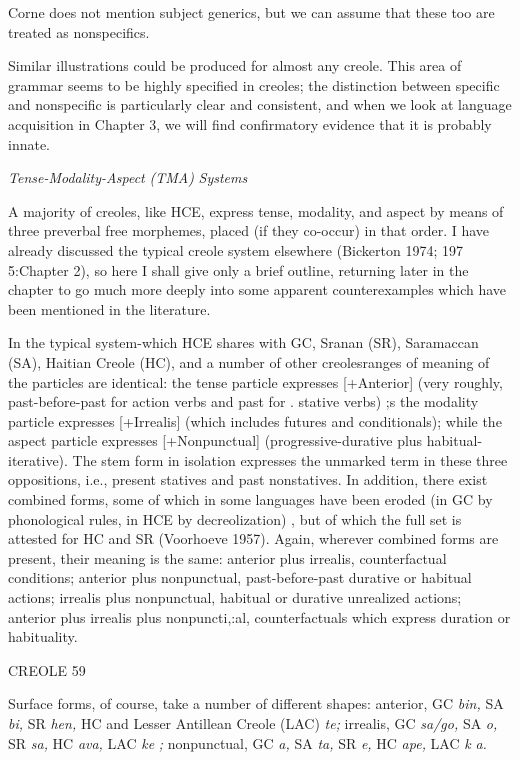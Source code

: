 Corne does not mention subject generics, but we can assume that these too are treated as nonspecifics.

Similar illustrations could be produced for almost any creole. This area of grammar seems to be highly specified in creoles; the dis\-tinction between specific and nonspecific is particularly clear and consistent, and when we look at language acquisition in Chapter 3, we will find confirmatory evidence that it is probably innate.

\textit{Tense-Modality-Aspect} \textit{(TM}\textit{A}\textit{)} \textit{S}\textit{ystems}

A majority of creoles, like HCE, express tense, modality, and aspect by means of three preverbal free morphemes, placed (if they co-occur) in that order. I have already discussed the typical creole system elsewhere (Bickerton 1974; 197 5:Chapter 2), so here I shall give only a brief outline, returning later in the chapter to go much more deeply into some apparent counterexamples which have been men\-tioned in the literature.

In the typical system-which HCE shares with GC, Sranan (SR), Saramaccan (SA), Haitian Creole (HC), and a number of other creoles\-ranges of meaning of the particles are identical: the tense particle ex\-presses [+Anterior] (very roughly, past-before-past for action verbs and past for . stative verbs) ;s the modality particle expresses [+Irrealis] (which includes futures and conditionals); while the aspect particle expresses [+Nonpunctual] (progressive-durative plus habitual-iterative). The stem form in isolation expresses the unmarked term in these three oppositions, i.e., present statives and past nonstatives. In addition, there exist combined forms, some of which in some languages have been eroded (in GC by phonological rules, in HCE by decreolization) , but of which the full set is attested for HC \citep{Hall1953} and SR (Voor\-hoeve 1957). Again, wherever combined forms are present, their meaning is the same: anterior plus irrealis, counterfactual conditions; anterior plus nonpunctual, past-before-past durative or habitual actions; irrealis plus nonpunctual, habitual or durative unrealized actions; anterior plus irrealis plus nonpuncti,:al, counterfactuals which express duration or habituality.

CREOLE 59

Surface forms, of course, take a number of different shapes: anterior, GC \textit{bin,} SA \textit{bi,} SR \textit{hen,} HC and Lesser Antillean Creole (LAC) \textit{te;} irrealis, GC \textit{sa/go,} SA \textit{o,} SR \textit{sa,} HC \textit{ava,} LAC \textit{ke} \textit{;} nonpunc\-tual, GC \textit{a,} SA \textit{ta,} SR \textit{e,} HC \textit{ape,} LAC \textit{k} \textit{a.}


